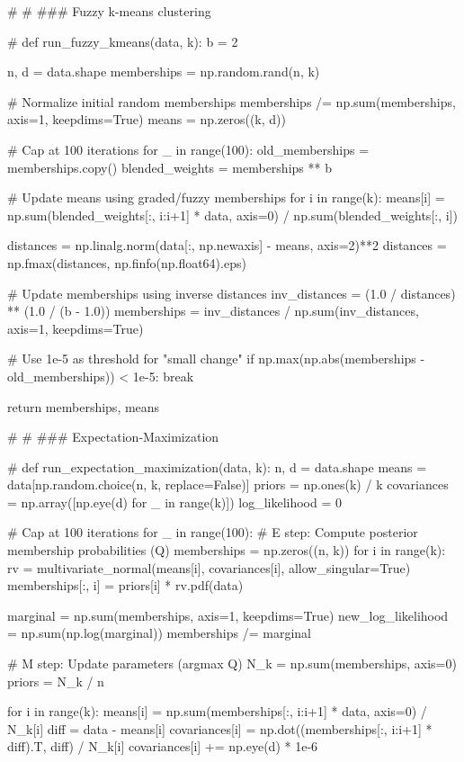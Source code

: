 \documentclass{article}
\begin{document}
{\begin{spverbatim}
# %
# ### Fuzzy k-means clustering 

# %
def run_fuzzy_kmeans(data, k):
  b = 2

  n, d = data.shape
  memberships = np.random.rand(n, k)
  
  # Normalize initial random memberships
  memberships /= np.sum(memberships, axis=1, keepdims=True)
  means = np.zeros((k, d))

  # Cap at 100 iterations
  for _ in range(100):
    old_memberships = memberships.copy()
    blended_weights = memberships ** b
    
    # Update means using graded/fuzzy memberships
    for i in range(k):
      means[i] = np.sum(blended_weights[:, i:i+1] * data, axis=0) / np.sum(blended_weights[:, i])
        
    distances = np.linalg.norm(data[:, np.newaxis] - means, axis=2)**2
    distances = np.fmax(distances, np.finfo(np.float64).eps) 
    
    # Update memberships using inverse distances
    inv_distances = (1.0 / distances) ** (1.0 / (b - 1.0))
    memberships = inv_distances / np.sum(inv_distances, axis=1, keepdims=True)

    # Use 1e-5 as threshold for "small change"
    if np.max(np.abs(memberships - old_memberships)) < 1e-5:
      break
          
  return memberships, means

# %
# ### Expectation-Maximization

# %
def run_expectation_maximization(data, k):
  n, d = data.shape
  means = data[np.random.choice(n, k, replace=False)]
  priors = np.ones(k) / k
  covariances = np.array([np.eye(d) for _ in range(k)]) 
  log_likelihood = 0

  # Cap at 100 iterations
  for _ in range(100):
    # E step: Compute posterior membership probabilities (Q)
    memberships = np.zeros((n, k))
    for i in range(k):
      rv = multivariate_normal(means[i], covariances[i], allow_singular=True)
      memberships[:, i] = priors[i] * rv.pdf(data)
        
    marginal = np.sum(memberships, axis=1, keepdims=True)
    new_log_likelihood = np.sum(np.log(marginal))
    memberships /= marginal
    
    # M step: Update parameters (argmax Q)
    N_k = np.sum(memberships, axis=0)
    priors = N_k / n
    
    for i in range(k):
      means[i] = np.sum(memberships[:, i:i+1] * data, axis=0) / N_k[i]
      diff = data - means[i]
      covariances[i] = np.dot((memberships[:, i:i+1] * diff).T, diff) / N_k[i]
      covariances[i] += np.eye(d) * 1e-6 


\end{spverbatim}}
\end{document}
